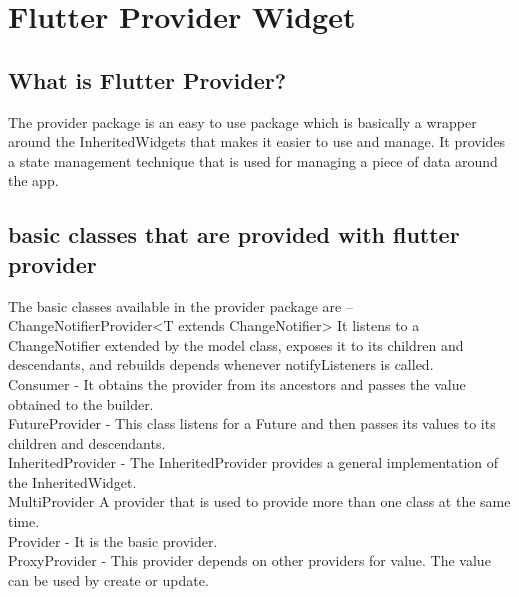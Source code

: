 
	\chapter{Flutter Provider Widget}




\section{What is Flutter Provider?}
The provider package is an easy to use package which is basically a wrapper around the InheritedWidgets that makes it easier to use and manage. It provides a state management technique that is used for managing a piece of data around the app.\\


\section{basic classes that are provided with flutter provider}
The basic classes available in the provider package are –\\
ChangeNotifierProvider<T extends ChangeNotifier> It listens to a ChangeNotifier extended by the model class, exposes it to its children and descendants, and rebuilds depends whenever notifyListeners is called.\\
Consumer - It obtains the provider from its ancestors and passes the value obtained to the builder.\\
FutureProvider - This class listens for a Future and then passes its values to its children and descendants.\\
InheritedProvider - The InheritedProvider provides a general implementation of the InheritedWidget.\\
MultiProvider A provider that is used to provide more than one class at the same time.\\
Provider -  It is the basic provider.\\
ProxyProvider - This provider depends on other providers for value. The value can be used by create or update.\\
